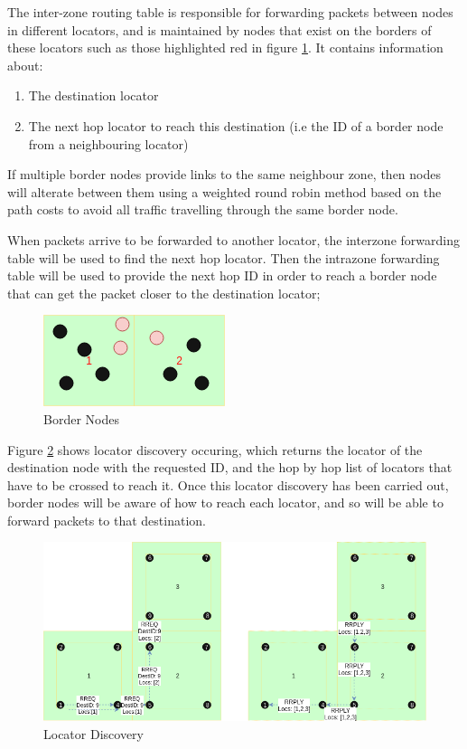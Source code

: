 \documentclass[12pt]{article}
\begin{document}

The inter-zone routing table is responsible for forwarding packets between nodes in different locators, and is maintained by nodes that exist on the borders of these locators such as those highlighted red in figure \ref{fig:border}. It contains information about:

\begin{enumerate}
	\item The destination locator 
	\item The next hop locator to reach this destination (i.e the ID of a border node from a neighbouring locator)
\end{enumerate}

If multiple border nodes provide links to the same neighbour zone, then nodes will alterate between them using a weighted round robin method based on the path costs to avoid all traffic travelling through the same border node.

When packets arrive to be forwarded to another locator, the interzone forwarding table will be used to find the next hop locator. Then the intrazone forwarding table will be used to provide the next hop ID in order to reach a border node that can get the packet closer to the destination locator;

\begin{figure}[!ht]
	\centering
	\includegraphics[width=0.5\linewidth]{images/nb}
	\caption{Border Nodes}
	\label{fig:border}
\end{figure}

Figure \ref{fig:external} shows locator discovery occuring, which returns the locator of the destination node with the requested ID, and the hop by hop list of locators that have to be crossed to reach it.
Once this locator discovery has been carried out, border nodes will be aware of how to reach each locator, and so will be able to forward packets to that destination.

\begin{figure}[!ht]
	\centering
	\includegraphics[width=0.8\linewidth]{images/external}
	\caption{Locator Discovery}
	\label{fig:external}
\end{figure}
\end{document}
